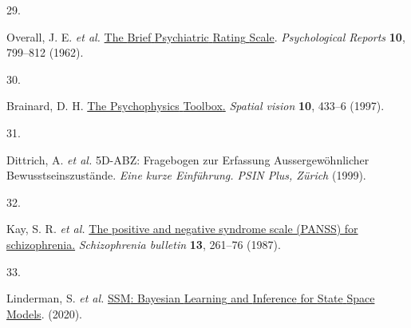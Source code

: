 \documentclass[
]{article}
\newlength{\cslhangindent}
\newlength{\csllabelwidth}
\newlength{\cslentryspacingunit} %
\newenvironment{CSLReferences}[2] %
 {%
  \setlength{\parindent}{0pt}
  \ifodd #1
  \let\oldpar\par
  \def\par{\hangindent=\cslhangindent\oldpar}
  \fi
  \setlength{\parskip}{#2\cslentryspacingunit}
 }%
 {}
\newcommand{\CSLLeftMargin}[1]{\parbox[t]{\csllabelwidth}{#1}}
\newcommand{\CSLRightInline}[1]{\parbox[t]{\linewidth - \csllabelwidth}{#1}\break}
\begin{document}
\begin{CSLReferences}{0}{0}
\leavevmode{}%
\CSLLeftMargin{29. }%
\CSLRightInline{Overall, J. E. \emph{et al.}
\href{https://doi.org/10.2466/pr0.1962.10.3.799}{The {Brief}
{Psychiatric} {Rating} {Scale}}. \emph{Psychological Reports}
\textbf{10}, 799--812 (1962).}

\leavevmode{}%
\CSLLeftMargin{30. }%
\CSLRightInline{Brainard, D. H.
\href{https://www.ncbi.nlm.nih.gov/pubmed/9176952}{The {Psychophysics}
{Toolbox}.} \emph{Spatial vision} \textbf{10}, 433--6 (1997).}

\leavevmode{}%
\CSLLeftMargin{31. }%
\CSLRightInline{Dittrich, A. \emph{et al.} {5D}-{ABZ}: {Fragebogen} zur
{Erfassung} {Aussergewöhnlicher} {Bewusstseinszustände}. \emph{Eine
kurze Einführung. PSIN Plus, Zürich} (1999).}

\leavevmode{}%
\CSLLeftMargin{32. }%
\CSLRightInline{Kay, S. R. \emph{et al.}
\href{https://www.ncbi.nlm.nih.gov/pubmed/3616518}{The positive and
negative syndrome scale ({PANSS}) for schizophrenia.}
\emph{Schizophrenia bulletin} \textbf{13}, 261--76 (1987).}

\leavevmode{}%
\CSLLeftMargin{33. }%
\CSLRightInline{Linderman, S. \emph{et al.}
\href{https://github.com/lindermanlab/ssm}{{SSM}: {Bayesian} {Learning}
and {Inference} for {State} {Space} {Models}}. (2020).}

\end{CSLReferences}
\end{document}
